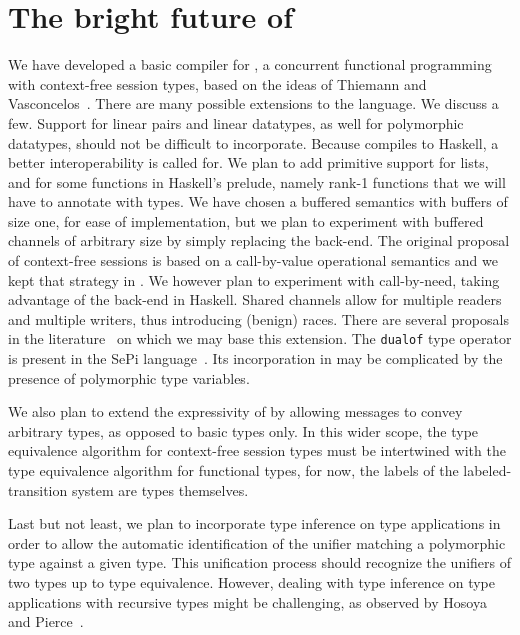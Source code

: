 \section{The bright future of \freest{}}
\label{sec:conclusion}

We have developed a basic compiler for \freest, a concurrent
functional programming with context-free session types, based on the
ideas of Thiemann and Vasconcelos~\cite{DBLP:conf/icfp/ThiemannV16}.
%
There are many possible extensions to the language. We discuss a
few.
%
Support for linear pairs and linear datatypes, as well for polymorphic
datatypes, should not be difficult to incorporate.
%
Because \freest{} compiles to Haskell, a better interoperability is
called for. We plan to add primitive support for lists, and for some
functions in Haskell's prelude, namely rank-1 functions that we will
have to annotate with \freest{} types.
%
We have chosen a buffered semantics with buffers of size one, for ease
of implementation, but we plan to experiment with buffered channels of
arbitrary size by simply replacing the back-end.
%
The original proposal of context-free sessions is based on a
call-by-value operational semantics and we kept that strategy in
\freest. We however plan to experiment with call-by-need, taking
advantage of the back-end in Haskell. 
%
Shared channels allow for multiple readers and multiple writers,
thus introducing (benign) races. There are several proposals in the
literature~\cite{DBLP:journals/pacmpl/BalzerP17,
  DBLP:conf/sefm/FrancoV13,Lindley.Morris_Lightweight.functional.session.types,DBLP:journals/iandc/Vasconcelos12}
on which we may base this extension.
%
The \lstinline|dualof| type operator is present in the SePi
language~\cite{DBLP:conf/sefm/FrancoV13}. Its incorporation in
\freest{} may be complicated by the presence of polymorphic type
variables.

We also plan to extend the expressivity of \freest{} by allowing
messages to convey arbitrary types, as opposed to basic types only.
In this wider scope, the type equivalence algorithm for context-free
session types must be intertwined with the type equivalence algorithm
for functional types, for now, the labels of the labeled-transition
system are types themselves.

Last but not least, we plan to incorporate type inference on type
applications in order to allow the automatic identification of the
unifier matching a polymorphic type against a given type. This
unification process should recognize the unifiers of two types up to
type equivalence. However, dealing with type inference on type
applications with recursive types might be challenging, as observed by
Hosoya and Pierce~\cite{DBLP:journals/toplas/PierceT00}.

